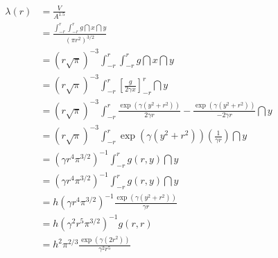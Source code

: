 \begin{align}
	\lambda(r) &= \frac{V}{A^{1.5}}\\
		&= 
	\frac{  \int_{-r}^{r}\int_{-r}^{r} g \dint{x}\dint{y}}
{ \left(   \pi r^2  \right)^{3/2}}\\
&=
 \left(r \sqrt{\pi}    \right)^{-3}
 \int_{-r}^{r}\int_{-r}^{r} g \dint{x}\dint{y}\\
&=
   \left(r \sqrt{\pi}    \right)^{-3}
\int_{-r}^{r} \left[   \frac{  g }{ 2\gamma x} \right]^{r}_{-r} \dint{y}\\
&=
 \left(r \sqrt{\pi}    \right)^{-3}
\int_{-r}^{r} 
 \frac{  \exp \left(\gamma \left(  y^2 + r^2 \right) \right)   }{ 2 \gamma r}
-  \frac{  \exp \left(\gamma \left(  y^2 + r^2 \right) \right)   }{- 2 \gamma r}
  \dint{y}\\
&=
 \left(r \sqrt{\pi}    \right)^{-3}
\int_{-r}^{r} 
 \exp \left(\gamma \left(  y^2 + r^2 \right) \right) 
\left( 
 \frac{  1 }{  \gamma r}
 \right)
  \dint{y}\\
&=
\left( \gamma r^4 \pi^{3/2}  \right)^{-1}
\int_{-r}^{r} g(r,y) \dint{y}\\
&=
\left( \gamma r^4 \pi^{3/2}  \right)^{-1}
\int_{-r}^{r} g(r,y) \dint{y}\\
&=
h\left( \gamma r^4 \pi^{3/2}  \right)^{-1}
 \frac{  \exp \left(\gamma \left(  y^2 + r^2 \right) \right)  }{ \gamma r}  \\
&=
h\left( \gamma^2 r^5 \pi^{3/2}  \right)^{-1}
 g(r,r)   \\
&=
h^2 \pi^{2/3}
\frac
{
\exp \left(\gamma \left(  2 r^2 \right) \right)
}
{
\gamma^2 r^5 
}
\end{align}

